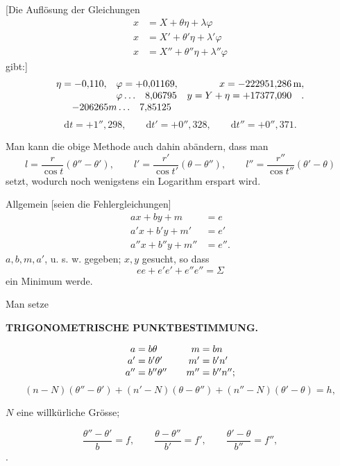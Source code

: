 [Die Auflösung der Gleichungen
\[
\begin{aligned}
 x&=X+\theta\eta+\lambda\varphi\\
 x&=X'+\theta'\eta+\lambda'\varphi\\
 x&=X''+\theta''\eta+\lambda''\varphi
\end{aligned}
\]
\noindent gibt:]
\[
\begin{array}{@{}r@{\quad}l@{\quad}r@{}}
 \eta=-0{,}110,&\varphi=+0{,}01169,&x=-222951{,}286\,\mathrm{m},\\
 &\varphi\,.\,.\,.\quad 8{,}06795&y=Y+\eta=+17377{,}090\quad .\\
 \multicolumn{2}{c}{-206265m\,.\,.\,.\quad 7{,}85125}&
\end{array}
\]
\[
 \mathrm{d}t=+1''{,}298,\qquad
 \mathrm{d}t'=+0''{,}328,\qquad
 \mathrm{d}t''=+0''{,}371.
\]

Man kann die obige Methode auch dahin abändern, dass man
\[
 l=\frac{r}{\cos t}(\theta''-\theta'),\qquad
 l'=\frac{r'}{\cos t'}(\theta-\theta''),\qquad
 l''=\frac{r''}{\cos t''}(\theta'-\theta)
\]
\noindent setzt, wodurch noch wenigstens ein Logarithm erspart wird.

\bigskip
{\centering
[4.]\par{}\par}
Allgemein [seien die Fehlergleichungen]
\[
\begin{aligned}
 ax+by+m&=e\\
 a'x+b'y+m'&=e'\\
 a''x+b''y+m''&=e''.
\end{aligned}
\]
\noindent \(a,b,m,a'\), u. s. w. gegeben; \(x,y\) gesucht, so dass
\[
 ee+e'e'+e''e''=\Sigma
\]
\noindent ein Minimum werde.

Man setze

\par\clearpage
\noindent\null\hfill{\small\textbf{TRIGONOMETRISCHE PUNKTBESTIMMUNG.}}\hfill{}\par\medskip

\[
\begin{array}{@{}r@{\;=\;}l@{\qquad}r@{\;=\;}l@{}}
 a&b\theta&m&bn\\
 a'&b'\theta'&m'&b'n'\\
 a''&b''\theta''&m''&b''n'';
\end{array}
\]
\[
 (n-N)(\theta''-\theta')+(n'-N)(\theta-\theta'')+
 (n''-N)(\theta'-\theta)=h,
\]
{\centering \(N\) eine willkürliche Grösse;\par}
\[
 \frac{\theta''-\theta'}{b}=f,\qquad
 \frac{\theta-\theta''}{b'}=f',\qquad
 \frac{\theta'-\theta}{b''}=f'',
\]
.
\]


